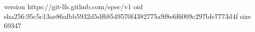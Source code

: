 version https://git-lfs.github.com/spec/v1
oid sha256:95c5c13ae86afbb5932d5df68549570f4382775a9f8e6f6009c297bfe7773d4f
size 69347
